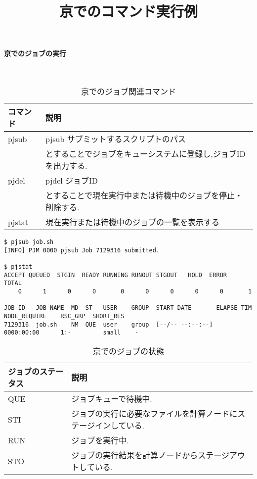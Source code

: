 \paragraph{京でのジョブの実行}~\\
\begin{table}[htb]
  \caption {京でのジョブ関連コマンド}
  \begin{center}
    \begin{tabular}{|p{2cm}|p{12cm}|}
      \hline
      コマンド & 説明 \\ \hline
      pjsub & pjsub サブミットするスクリプトのパス\\
            & とすることでジョブをキューシステムに登録し,ジョブIDを出力する.\\ \hline
      pjdel & pjdel ジョブID\\
            & とすることで現在実行中または待機中のジョブを停止・削除する.\\ \hline
      pjstat & 現在実行または待機中のジョブの一覧を表示する\\ \hline
    \end{tabular}
  \end{center}
\end{table}

{\footnotesize

}

\begin{table}[htb]
  \begin{center}
  \title {京でのコマンド実行例}
{\scriptsize
\begin{framed}
\begin{verbatim}
$ pjsub job.sh
[INFO] PJM 0000 pjsub Job 7129316 submitted.

$ pjstat
ACCEPT QUEUED  STGIN  READY RUNNING RUNOUT STGOUT   HOLD  ERROR   TOTAL
    0      1      0      0       0      0      0      0      0       1

JOB_ID   JOB_NAME  MD  ST   USER    GROUP  START_DATE       ELAPSE_TIM  NODE_REQUIRE    RSC_GRP  SHORT_RES
7129316  job.sh    NM  QUE  user    group  [--/-- --:--:--]  0000:00:00      1:-         small    -
\end{verbatim}
\end{framed}
}
\end{center}
\end{table}

\begin{table}[htb]
  \caption {京でのジョブの状態}
  \begin{center}
    \begin{tabular}{|p{2cm}|p{12cm}|}
      \hline
      ジョブのステータス & 説明 \\ \hline
      QUE & ジョブキューで待機中.\\ \hline
      STI & ジョブの実行に必要なファイルを計算ノードにステージインしている.\\ \hline
      RUN & ジョブを実行中.\\ \hline
      STO & ジョブの実行結果を計算ノードからステージアウトしている.\\ \hline
    \end{tabular}
  \end{center}
\end{table}
